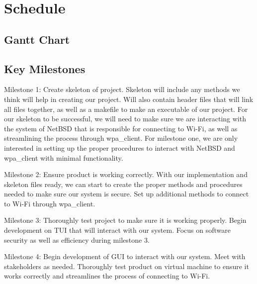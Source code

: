 \section{Schedule}

\subsection{Gantt Chart}

\subsection{Key Milestones}

Milestone 1: Create skeleton of project. Skeleton will include any methods we think will help in creating our project. Will also contain header 
files that will link all files together, as well as a makefile to make an executable of our project. For our skeleton to be successful, we will 
need to make sure we are interacting with the system of NetBSD that is responsible for connecting to Wi-Fi, as well as streamlining the process 
through wpa_client. For milestone one, we are only interested in setting up the proper procedures to interact with NetBSD and wpa_client with minimal 
functionality. 

Milestone 2: Ensure product is working correctly. With our implementation and skeleton files ready, we can start to create the proper methods and procedures 
needed to make sure our system is secure. Set up additional methods to connect to Wi-Fi through wpa_client. 

Milestone 3: Thoroughly test project to make sure it is working properly. Begin development on TUI that will interact with our system. Focus on software security 
as well as efficiency during milestone 3. 

Milestone 4: Begin development of GUI to interact with our system. Meet with stakeholders as needed. Thoroughly test product on virtual machine to ensure it works 
correctly and streamlines the process of connecting to Wi-Fi. 

